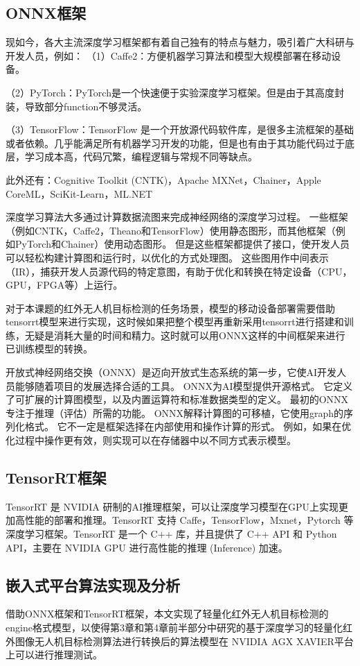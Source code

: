 \subsection{ONNX框架}
现如今，各大主流深度学习框架都有着自己独有的特点与魅力，吸引着广大科研与开发人员，例如：
（1）Caffe2：方便机器学习算法和模型大规模部署在移动设备。

（2）PyTorch：PyTorch是一个快速便于实验深度学习框架。但是由于其高度封装，导致部分function不够灵活。

（3）TensorFlow：TensorFlow 是一个开放源代码软件库，是很多主流框架的基础或者依赖。几乎能满足所有机器学习开发的功能，但是也有由于其功能代码过于底层，学习成本高，代码冗繁，编程逻辑与常规不同等缺点。

此外还有：Cognitive Toolkit (CNTK)，Apache MXNet，Chainer，Apple CoreML，SciKit-Learn，ML.NET

深度学习算法大多通过计算数据流图来完成神经网络的深度学习过程。 一些框架（例如CNTK，Caffe2，Theano和TensorFlow）使用静态图形，而其他框架（例如PyTorch和Chainer）使用动态图形。 但是这些框架都提供了接口，使开发人员可以轻松构建计算图和运行时，以优化的方式处理图。 这些图用作中间表示（IR），捕获开发人员源代码的特定意图，有助于优化和转换在特定设备（CPU，GPU，FPGA等）上运行。

对于本课题的红外无人机目标检测的任务场景，模型的移动设备部署需要借助tensorrt模型来进行实现，这时候如果把整个模型再重新采用tensorrt进行搭建和训练，无疑是消耗大量的时间和精力。这时就可以用ONNX这样的中间框架来进行已训练模型的转换。

开放式神经网络交换（ONNX）是迈向开放式生态系统的第一步，它使AI开发人员能够随着项目的发展选择合适的工具。 ONNX为AI模型提供开源格式。 它定义了可扩展的计算图模型，以及内置运算符和标准数据类型的定义。 最初的ONNX专注于推理（评估）所需的功能。 ONNX解释计算图的可移植，它使用graph的序列化格式。 它不一定是框架选择在内部使用和操作计算的形式。 例如，如果在优化过程中操作更有效，则实现可以在存储器中以不同方式表示模型。

\subsection{TensorRT框架}
TensorRT 是 NVIDIA 研制的AI推理框架，可以让深度学习模型在GPU上实现更加高性能的部署和推理。TensorRT 支持 Caffe，TensorFlow，Mxnet，Pytorch 等深度学习框架。TensorRT 是一个 C++ 库，并且提供了 C++ API 和 Python API，主要在 NVIDIA GPU 进行高性能的推理 (Inference) 加速。

\subsection{嵌入式平台算法实现及分析}
借助ONNX框架和TensorRT框架，本文实现了轻量化红外无人机目标检测的engine格式模型，以使得第3章和第4章前半部分中研究的基于深度学习的轻量化红外图像无人机目标检测算法进行转换后的算法模型在 NVIDIA AGX XAVIER平台上可以进行推理测试。

